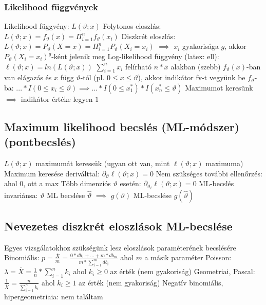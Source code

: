\documentclass[12pt,a4paper]{article}
\begin{document}
\subsubsection{Likelihood függvények}

\begin{outline}
	\1 Likelihood függvény: $L(\vartheta;x)$
		\2 Folytonos eloszlás: $L(\vartheta;x) = f_\vartheta(x) = \Pi_{i=1}^n f_\vartheta(x_i)$
		\2 Diszkrét eloszlás:  $L(\vartheta;x) = P_\vartheta(X=x) = \Pi_{i=1}^n P_\vartheta(X_i = x_i)$
			\3 $\implies$ $x_i$ gyakorisága $g$, akkor $P_\vartheta(X_i = x_i)^g$-ként jelenik meg
	\1 Log-likelihood függvény (latex: ell): $\ell(\vartheta;x) = ln(L(\vartheta;x))$
	\1 $\sum_{i=1}^n x_i$ felírható $n * \overline{x}$ alakban (szebb)
	\1 $f_\vartheta(x)$-ban van elágazás és $x$ függ $\vartheta$-tól (pl. $0 \le x \le \vartheta$), akkor indikátor fv-t vegyünk be $f_\vartheta$-ba:
	$...*I(0 \le x_i \le \vartheta) \implies ... * I(0 \le x_1^*) * I(x_n^* \le \vartheta)$
		\2 Maximumot keresünk $\implies$ indikátor értéke legyen $1$
\end{outline}

\pagebreak

\subsection{Maximum likelihood becslés (ML-módszer) (pontbecslés)}

\begin{outline}
	\1 $L(\vartheta;x)$ maximumát keressük (ugyan ott van, mint $\ell(\vartheta;x)$ maximuma)
	\1 Maximum keresése deriválttal: $\partial_\vartheta \ell(\vartheta;x) = 0$
		\2 Nem szükséges további ellenőrzés: ahol $0$, ott a max
		\2 Több dimenziós $\vartheta$ esetén: $\partial_{\vartheta_i} \ell(\vartheta;x) = 0$
	\1 ML-becslés invariánsa: $\vartheta$ ML becslése $\hat{\vartheta}$ $\implies$ $g(\vartheta)$ ML-becslése $g(\hat{\vartheta})$
\end{outline}

\subsection{Nevezetes diszkrét eloszlások ML-becslése}

\begin{outline}
	\1 Egyes vizsgálatokhoz szükségünk lesz eloszlások paraméterének becslésére
	\1 Binomiális: $p = \frac{\overline{X}}{m} = \frac{0*db_1 + ... + m*db_m}{m * \sum_{i=1}^m db_i}$ ahol $m$ a másik paraméter
	\1 Poisson: $\lambda = \overline{X} = \frac{1}{n} * \sum_{i=1}^n k_i$
	ahol $k_i \ge 0$ az érték (nem gyakoriság)
	\1 Geometriai, Pascal: $\frac{1}{\overline{X}} = \frac{n}{\sum_{i=1}^n k_i}$
	ahol $k_i \ge 1$ az érték (nem gyakoriság)
	\1 Negatív binomiális, hipergeometriaia: nem találtam
\end{outline}
\end{document}
